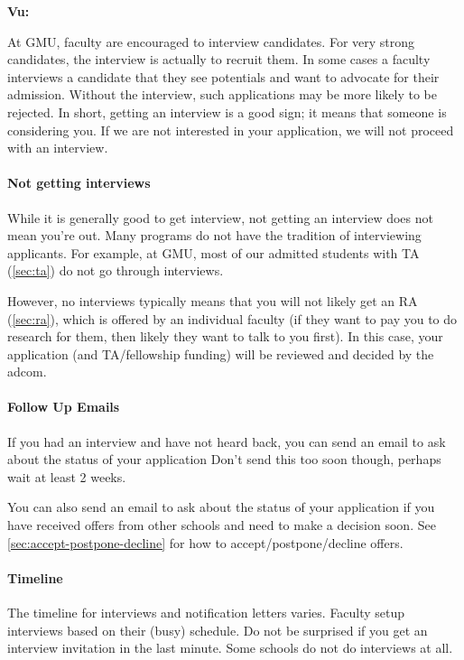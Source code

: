 \documentclass[oneside,11pt,dvipsnames]{book}
\newenvironment{commentbox}[1][]{
  \small
  \begin{mybox}
    {\small \textbf{#1}}
  }{
  \end{mybox}
}
\begin{document}
\begin{commentbox}[Vu:]
  At GMU, faculty are encouraged to interview candidates. For very strong candidates, the interview is actually to recruit them.  In some cases a faculty interviews a candidate that they see potentials and want to advocate for their admission. Without the interview, such applications may be more likely to be rejected.
  \tcblower
  In short, getting an interview is a good sign; it means that someone is considering you. If we are not interested in your application, we will not proceed with an interview.
\end{commentbox}

\paragraph{Not getting interviews} While it is generally good to get interview, not getting an interview does not mean you're out.  Many programs do not have the tradition of interviewing applicants. For example, at GMU, most of our admitted students with TA (\autoref{sec:ta}) do not go through interviews.

However, no interviews typically means that you will not likely get an RA (\autoref{sec:ra}), which is offered by an individual faculty (if they want to pay you to do research for them, then likely they want to talk to you first).  In this case, your application (and TA/fellowship funding) will be reviewed and decided by the adcom.

\paragraph{Follow Up Emails} If you had an interview and have not heard back, you can send an email to ask about the status of your application Don't send this too soon though, perhaps wait at least 2 weeks.

You can also send an email to ask about the status of your application if you have received offers from other schools and need to make a decision soon. See \autoref{sec:accept-postpone-decline} for how to accept/postpone/decline offers.

\paragraph{Timeline} The timeline for interviews and notification letters varies.  Faculty setup interviews based on their (busy) schedule. Do not be surprised if you get an interview invitation in the last minute. Some schools do not do interviews at all.
\end{document}
